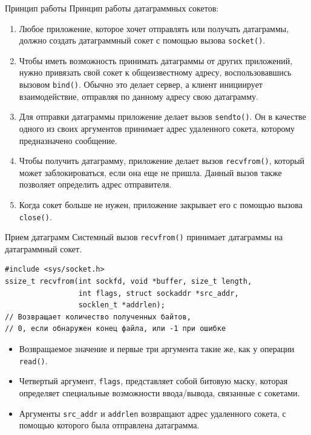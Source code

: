 \documentclass{beamer}
\begin{document}
\begin{frame}[shrink]{Принцип работы}
    Принцип работы датаграммных сокетов:
    \begin{enumerate}
        \item Любое приложение, которое хочет отправлять или получать датаграммы, должно создать датаграммный сокет с помощью вызова \texttt{socket()}.
        
        \item Чтобы иметь возможность принимать датаграммы от других приложений, нужно привязать свой сокет к общеизвестному адресу, воспользовавшись вызовом \texttt{bind()}. Обычно это делает сервер, а клиент инициирует взаимодействие, отправляя по данному адресу свою датаграмму.
        
        \item Для отправки датаграммы приложение делает вызов \texttt{sendto()}. Он в качестве одного из своих аргументов принимает адрес удаленного сокета, которому предназначено сообщение.
        
        \item Чтобы получить датаграмму, приложение делает вызов \texttt{recvfrom()}, который может заблокироваться, если она еще не пришла. Данный вызов также позволяет определить адрес отправителя.
        
        \item Когда сокет больше не нужен, приложение закрывает его с помощью вызова \texttt{close()}.
    \end{enumerate}
\end{frame}

\begin{frame}[fragile]{Прием датаграмм}
    Системный вызов \texttt{recvfrom()} принимает датаграммы на датаграммный сокет.
    
\begin{verbatim}
#include <sys/socket.h>
ssize_t recvfrom(int sockfd, void *buffer, size_t length,
                 int flags, struct sockaddr *src_addr, 
                 socklen_t *addrlen);
// Возвращает количество полученных байтов, 
// 0, если обнаружен конец файла, или -1 при ошибке
\end{verbatim}
	
	\begin{itemize}
	    \item Возвращаемое значение и первые три аргумента такие же, как у операции \texttt{read()}.
	    \item Четвертый аргумент, \texttt{flags}, представляет собой битовую маску, которая определяет специальные возможности ввода/вывода, связанные с сокетами.
	    \item Аргументы \texttt{src\_addr} и \texttt{addrlen} возвращают адрес удаленного сокета, с помощью которого была отправлена датаграмма. 
	\end{itemize}
\end{frame}
\end{document}

